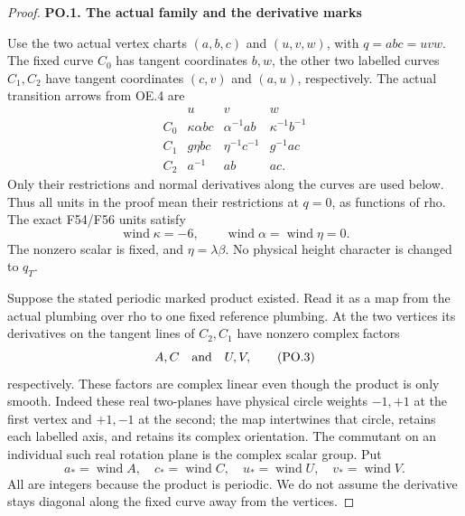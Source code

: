 \begin{proof}
\par

\medskip\noindent\textbf{PO.1. The actual family and the derivative marks}

\par\nobreak

Use the two actual vertex charts \((a,b,c)\) and \((u,v,w)\), with
\(q=abc=uvw\). The fixed curve \(C_0\) has tangent coordinates
\(b,w\), the other two labelled curves \(C_1,C_2\) have tangent
coordinates \((c,v)\) and \((a,u)\), respectively. The actual
transition arrows from OE.4 are
\[
 \begin{array}{c|ccc}
 &u&v&w\\ \hline
 C_0&\kappa\alpha bc&\alpha^{-1}ab&\kappa^{-1}b^{-1}\\
 C_1&g\eta bc&\eta^{-1}c^{-1}&g^{-1}ac\\
 C_2&a^{-1}&ab&ac.
 \end{array}                                                   \tag{PO.1}
\]
Only their restrictions and normal derivatives along the curves are
used below. Thus all units in the proof mean their restrictions at
\(q=0\), as functions of rho. The exact F54/F56 units satisfy
\[
 \operatorname{wind}\kappa=-6,\qquad
 \operatorname{wind}\alpha=\operatorname{wind}\eta=0. \tag{PO.2}
\]
The nonzero scalar is fixed, and \(\eta=\lambda\beta\). No physical
height character is changed to \(q_T\).

Suppose the stated periodic marked product existed. Read it as a map
from the actual plumbing over rho to one fixed reference plumbing.
At the two vertices its derivatives on the tangent lines of
\(C_2,C_1\) have nonzero complex factors
\[
               A,C\quad\hbox{and}\quad U,V,
                                                               \tag{PO.3}
\]
respectively. These factors are complex linear even though the product
is only smooth. Indeed these real two-planes have physical circle
weights \(-1,+1\) at the first vertex and \(+1,-1\) at the second;
the map intertwines that circle, retains each labelled axis, and
retains its complex orientation. The commutant on an individual such
real rotation plane is the complex scalar group. Put
\[
 a_* =\operatorname{wind}A,\quad
 c_* =\operatorname{wind}C,\quad
 u_* =\operatorname{wind}U,\quad
 v_* =\operatorname{wind}V.                            \tag{PO.4}
\]
All are integers because the product is periodic. We do not assume
the derivative stays diagonal along the fixed curve away from the
vertices.


\end{proof}
